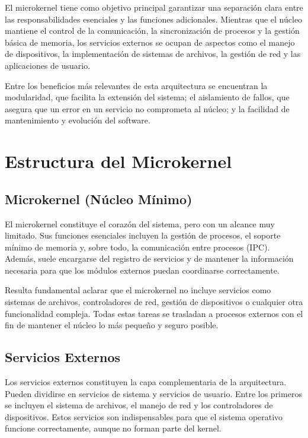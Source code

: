 \documentclass[12pt,a4paper]{article}
\begin{document}
El microkernel tiene como objetivo principal garantizar una separación clara entre las responsabilidades esenciales y las funciones adicionales. Mientras que el núcleo mantiene el control de la comunicación, la sincronización de procesos y la gestión básica de memoria, los servicios externos se ocupan de aspectos como el manejo de dispositivos, la implementación de sistemas de archivos, la gestión de red y las aplicaciones de usuario.

Entre los beneficios más relevantes de esta arquitectura se encuentran la modularidad, que facilita la extensión del sistema; el aislamiento de fallos, que asegura que un error en un servicio no comprometa al núcleo; y la facilidad de mantenimiento y evolución del software.

\section{Estructura del Microkernel}

\subsection{Microkernel (Núcleo Mínimo)}

El microkernel constituye el corazón del sistema, pero con un alcance muy limitado. Sus funciones esenciales incluyen la gestión de procesos, el soporte mínimo de memoria y, sobre todo, la comunicación entre procesos (IPC). Además, suele encargarse del registro de servicios y de mantener la información necesaria para que los módulos externos puedan coordinarse correctamente.

Resulta fundamental aclarar que el microkernel no incluye servicios como sistemas de archivos, controladores de red, gestión de dispositivos o cualquier otra funcionalidad compleja. Todas estas tareas se trasladan a procesos externos con el fin de mantener el núcleo lo más pequeño y seguro posible.

\subsection{Servicios Externos}

Los servicios externos constituyen la capa complementaria de la arquitectura. Pueden dividirse en servicios de sistema y servicios de usuario. Entre los primeros se incluyen el sistema de archivos, el manejo de red y los controladores de dispositivos. Estos servicios son indispensables para que el sistema operativo funcione correctamente, aunque no forman parte del kernel.
\end{document}
